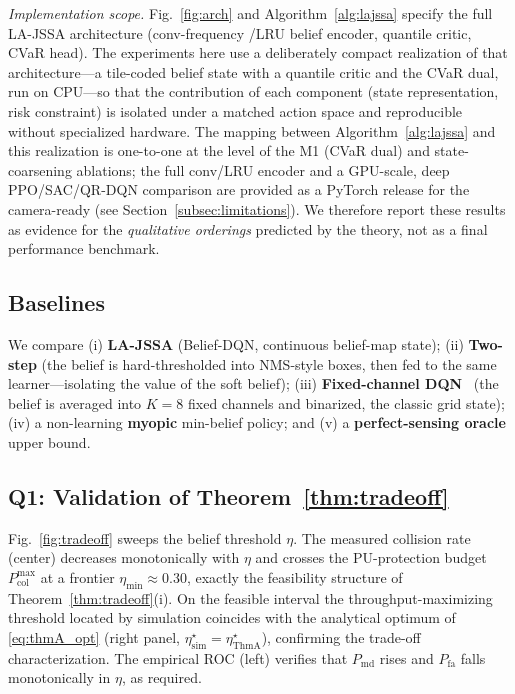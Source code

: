 \documentclass[journal]{IEEEtran}
\newcommand{\Pmd}{P_{\mathrm{md}}}         %
\newcommand{\Pfa}{P_{\mathrm{fa}}}         %
\newcommand{\thr}{\eta}                    %
\newcommand{\Pcolmax}{P_{\mathrm{col}}^{\max}} %
\begin{document}
\emph{Implementation scope.} Fig.~\ref{fig:arch} and
Algorithm~\ref{alg:lajssa} specify the full LA-JSSA architecture (conv-frequency
/LRU belief encoder, quantile critic, CVaR head). The experiments here use a
deliberately compact realization of that architecture---a tile-coded belief
state with a quantile critic and the CVaR dual, run on CPU---so that the
contribution of each component (state representation, risk constraint) is
isolated under a matched action space and reproducible without specialized
hardware. The mapping between Algorithm~\ref{alg:lajssa} and this realization
is one-to-one at the level of the M1 (CVaR dual) and state-coarsening
ablations; the full conv/LRU encoder and a GPU-scale, deep PPO/SAC/QR-DQN
comparison are provided as a PyTorch release for the camera-ready (see
Section~\ref{subsec:limitations}). We therefore report these results as
evidence for the \emph{qualitative orderings} predicted by the theory, not as
a final performance benchmark.

\subsection{Baselines}
We compare (i) \textbf{LA-JSSA} (Belief-DQN, continuous belief-map state);
(ii) \textbf{Two-step} (the belief is hard-thresholded into NMS-style boxes,
then fed to the same learner---isolating the value of the soft belief);
(iii) \textbf{Fixed-channel DQN}~\cite{wang2018} (the belief is averaged into
$K=8$ fixed channels and binarized, the classic grid state);
(iv) a non-learning \textbf{myopic} min-belief policy; and (v) a
\textbf{perfect-sensing oracle} upper bound.

\subsection{Q1: Validation of Theorem~\ref{thm:tradeoff}}
Fig.~\ref{fig:tradeoff} sweeps the belief threshold $\thr$. The measured
collision rate (center) decreases monotonically with $\thr$ and crosses the
PU-protection budget $\Pcolmax$ at a frontier $\thr_{\min}\approx0.30$,
exactly the feasibility structure of Theorem~\ref{thm:tradeoff}(i). On the
feasible interval the throughput-maximizing threshold located by simulation
coincides with the analytical optimum of \eqref{eq:thmA_opt} (right panel,
$\thr^\star_{\mathrm{sim}}=\thr^\star_{\mathrm{Thm A}}$), confirming the
trade-off characterization. The empirical ROC (left) verifies that $\Pmd$
rises and $\Pfa$ falls monotonically in $\thr$, as required.
\end{document}
